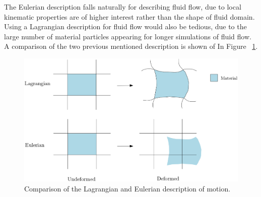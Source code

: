 The Eulerian description falls naturally for describing fluid flow, due to local kinematic properties are of higher interest rather than the shape of fluid domain. Using a Lagrangian description for fluid flow would also be tedious, due to the large number of material particles appearing for longer simulations of fluid flow. A comparison of the two previous mentioned description is shown of In Figure ~\ref{fig:lageul}.
\begin{figure}[h!]
  \centering
    \includegraphics[scale=0.28]{./Fig/lageul.png}
      \caption{Comparison of the Lagrangian and Eulerian description of motion.}
      \label{fig:lageul}
\end{figure}
 \newpage
